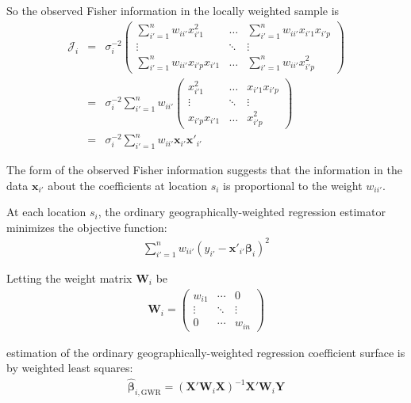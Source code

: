 \documentclass[authoryear, review, 11pt]{elsarticle}
\begin{document}
	So the observed Fisher information in the locally weighted sample is
	\begin{eqnarray}
		\bm{\mathcal{J}}_i &=& \sigma^{-2}_i \left( \begin{array}{ccc} \sum_{i'=1}^n  w_{ii'} x^2_{i'1}   & \dots & \sum_{i'=1}^n w_{ii'} x_{i'1} x_{i'p}   \\ \vdots & \ddots & \vdots \\ \sum_{i'=1}^n  w_{ii'} x_{i'p} x_{i'1}    & \dots & \sum_{i'=1}^n  w_{ii'} x^2_{i'p}  \end{array} \right) \\
		&=& \sigma^{-2}_i \sum_{i'=1}^n w_{ii'}\left( \begin{array}{ccc}  x^2_{i'1} & \dots & x_{i'1} x_{i'p} \\ \vdots & \ddots & \vdots \\ x_{i'p} x_{i'1} & \dots &  x^2_{i'p} \end{array} \right) \\
		&=& \sigma^{-2}_i \sum_{i'=1}^n w_{ii'} \bm{x}_{i'} \bm{x}'_{i'}
	\end{eqnarray}	
	
	The form of the observed Fisher information suggests that the information in the data $\bm{x}_{i'}$ about the coefficients at location $s_i$ is proportional to the weight $w_{ii'}$.
	
	At each location $s_i$, the ordinary geographically-weighted regression estimator minimizes the objective function:
	\begin{eqnarray}
		\sum_{i'=1}^n w_{ii'} \left(y_{i'} - \bm{x}'_{i'} \bm{\beta}_i \right)^2
	\end{eqnarray}
	
	Letting the weight matrix $\bm{W}_i$ be	
	\begin{eqnarray}
		\bm{W}_i =  \left( \begin{array}{ccc} w_{i1} & \cdots & 0 \\ \vdots & \ddots & \vdots \\ 0 & \cdots & w_{in} \end{array} \right)
	\end{eqnarray}
	
	estimation of the ordinary geographically-weighted regression coefficient surface is by weighted least squares:	
	\begin{eqnarray}
		\hat{\bm{\beta}}_{i, \text{GWR}} = \left( \bm{X}'\bm{W}_i\bm{X} \right)^{-1} \bm{X}'\bm{W}_i\bm{Y}
	\end{eqnarray}
	
\end{document}
